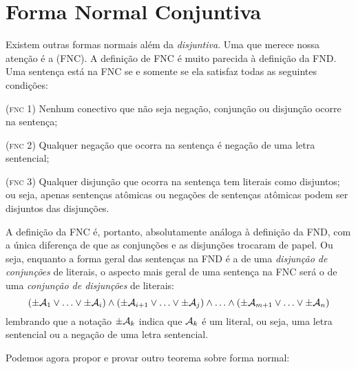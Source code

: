 


\section{Forma Normal Conjuntiva}
\label{s:CNF}

Existem outras formas normais além da \emph{disjuntiva}.
Uma que merece nossa atenção é a  (FNC).
A definição de FNC é muito parecida à definição da FND.
Uma sentença está na FNC se e somente se ela satisfaz todas as seguintes condições:
	\begin{earg}
		\item[(\textsc{fnc 1})] Nenhum conectivo que não seja negação, conjunção ou disjunção ocorre na sentença;
		\item[(\textsc{fnc 2})] Qualquer negação que ocorra na sentença é negação de uma letra sentencial;
		\item[(\textsc{fnc 3})] Qualquer disjunção que ocorra na sentença tem literais como disjuntos; ou seja, apenas sentenças atômicas ou negações de sentenças atômicas podem ser disjuntos das disjunções.
	\end{earg}

\noindent A definição da FNC é, portanto, absolutamente análoga à definição da FND, com a única diferença de que as conjunções e as disjunções trocaram de papel.
Ou seja, enquanto a forma geral das sentenças na FND é a de uma \textit{disjunção de conjunções} de literais, o aspecto mais geral de uma sentença na FNC será o de uma \textit{conjunção de disjunções} de literais:
$$(\pm \mathcal{A}_1 \lor \ldots \lor \pm \mathcal{A}_i) \land (\pm \mathcal{A}_{i+1} \lor \ldots \lor \pm\mathcal{A}_j) \land \ldots \land (\pm\mathcal{A}_{m+1} \lor\ldots \lor \pm \mathcal{A}_n)$$
lembrando que a notação $\pm\mathcal{A}_k$ indica que $\mathcal{A}_k$ é um literal, ou seja, uma letra sentencial ou a negação de uma letra sentencial.

Podemos agora propor e provar outro teorema sobre forma normal:

